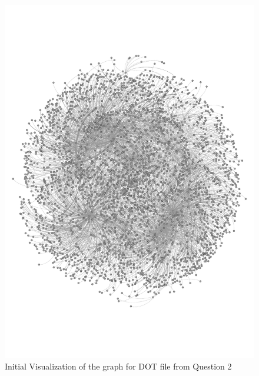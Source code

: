 \begin{figure}
	 \begin{center}
		\includegraphics[scale=0.8]{q3/a4-q3-1.pdf}
		\caption{Initial Visualization of the graph for DOT file from Question 2}
		\label{fig:q3-1}
 	\end{center}
\end{figure}

